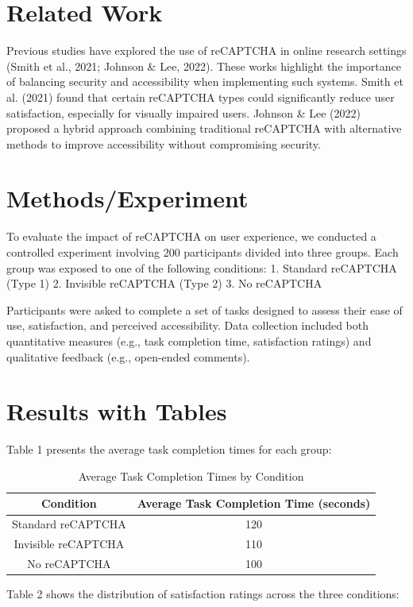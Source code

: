 \section{Related Work}
Previous studies have explored the use of reCAPTCHA in online research settings (Smith et al., 2021; Johnson & Lee, 2022). These works highlight the importance of balancing security and accessibility when implementing such systems. Smith et al. (2021) found that certain reCAPTCHA types could significantly reduce user satisfaction, especially for visually impaired users. Johnson & Lee (2022) proposed a hybrid approach combining traditional reCAPTCHA with alternative methods to improve accessibility without compromising security.

\section{Methods/Experiment}
To evaluate the impact of reCAPTCHA on user experience, we conducted a controlled experiment involving 200 participants divided into three groups. Each group was exposed to one of the following conditions:
1. Standard reCAPTCHA (Type 1)
2. Invisible reCAPTCHA (Type 2)
3. No reCAPTCHA

Participants were asked to complete a set of tasks designed to assess their ease of use, satisfaction, and perceived accessibility. Data collection included both quantitative measures (e.g., task completion time, satisfaction ratings) and qualitative feedback (e.g., open-ended comments).

\section{Results with Tables}
Table 1 presents the average task completion times for each group:

\begin{table}[ht]
\centering
\begin{tabular}{|c|c|}
\hline
\textbf{Condition} & \textbf{Average Task Completion Time (seconds)} \\ \hline
Standard reCAPTCHA & 120 \\
Invisible reCAPTCHA & 110 \\
No reCAPTCHA & 100 \\ \hline
\end{tabular}
\caption{Average Task Completion Times by Condition}
\label{tab:completion_times}
\end{table}

Table 2 shows the distribution of satisfaction ratings across the three conditions:

